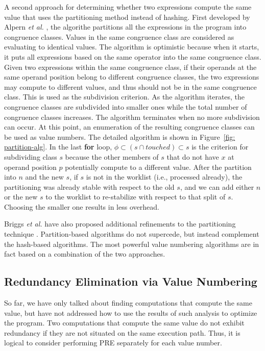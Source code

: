 A second approach for determining whether two expressions compute the
same value that uses the partitioning method instead of hashing. 
First developed by
Alpern {\it et al.} \cite{AWZ88}, the algorithe partitions all the expressions
in the program into congruence classes.  Values in the same congruence class 
are considered as evaluating to identical values.  The algorithm is 
optimistic because when it starts,
it puts all expressions based on the same operator into the same
congruence class.  Given two expressions within the same congruence class, if 
their operands at the same operand position belong to different congruence
classes, the two expressions may compute to different values, and thus should
not be in the same congruence class.  This is used as the subdivision 
criterion.  As the algorithm iterates, the congruence classes are subdivided
into smaller ones while the total number of congruence classes increases.
The algorithm terminates when no more subdivision can occur.
At this point, an enumeration of the resulting congruence classes can be
used as value numbers.  The detailed algorithm is shown in 
Figure~\ref{fig: partition-alg}. In the last {\bf for} loop, 
$\phi \subset (s \cap touched) \subset s$ is the criterion for subdividing
class $s$ because the other members of $s$ that do not have $x$ at
operand position $p$ potentially compute to a different value.  
After the partition into $n$ and the new $s$,
if $s$ is not in the worklist (i.e., processed already), the 
partitioning was already stable with respect to the old $s$, and
we can add either $n$ or the new $s$ to the worklist to re-stabilize with
respect to that split of $s$.  Choosing the smaller one results in less
overhead.

Briggs {\it et al.} have also proposed additional refinements to the 
partitioning technique \cite{Briggs97}.  
Partition-based algorithms do not supercede, but 
instead complement the hash-based algorithms.
The most powerful value numbering algorithms are in fact based on
a combination of the two approaches.

\subsection{Redundancy Elimination via Value Numbering}

So far, we have only talked about finding computations that compute the
same value, but have not addressed how to use the results of such analysis 
to optimize the program.  Two computations that compute the same value do
not exhibit redundancy if they are not situated on the same
execution path.  Thus, it is logical to consider performing PRE separately
for each value number.  

